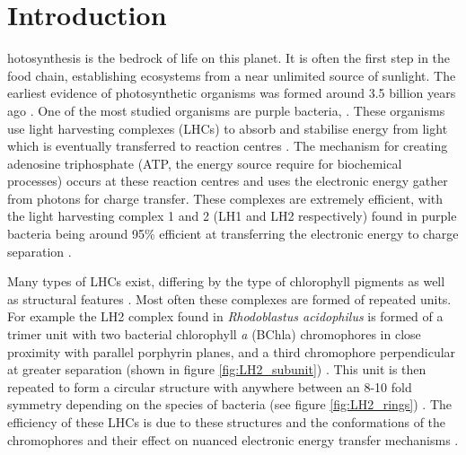 %
%
\chapter{Introduction}
\label{chap:intro}

hotosynthesis is the bedrock of life on this planet. It is often the 
first step in the food chain, establishing ecosystems from a near unlimited source 
of sunlight. The earliest evidence of photosynthetic organisms was formed around
3.5 billion years ago \cite{Blankenship2010}. One of the most studied organisms are
purple bacteria, \cite{Cogdell2021}. These organisms use light harvesting complexes 
(LHCs) to absorb and stabilise energy from light which is eventually transferred 
to reaction centres \cite{Klamt2008}. The mechanism for creating adenosine triphosphate
(ATP, the energy source require for biochemical processes) occurs at these reaction
centres and uses the electronic energy gather from photons for charge transfer.
These complexes are extremely efficient, with the light harvesting complex 1 and 
2 (LH1 and LH2 respectively) found in purple bacteria being around 95\% efficient
at transferring the electronic energy to charge separation \cite{Tretiak2000}.

Many types of LHCs exist, differing by the type of chlorophyll pigments as well 
as structural features . Most often these complexes are formed of repeated units.
For example the LH2 complex found in \emph{Rhodoblastus acidophilus} is formed of 
a trimer unit with two bacterial chlorophyll \emph{a} (BChla) chromophores in close 
proximity with parallel porphyrin planes, and a third chromophore perpendicular 
at greater separation (shown in figure \ref{fig:LH2_subunit}) \cite{Cogdell2006}. 
This unit is then repeated to form a circular structure with anywhere between an
8-10 fold symmetry depending on the species of bacteria (see figure \ref{fig:LH2_rings})
\cite{Mallus2018, Cleary2013}. The efficiency of these LHCs is due to these structures
and the conformations of the chromophores and their effect on nuanced electronic
energy transfer mechanisms \cite{Harel2012}.

